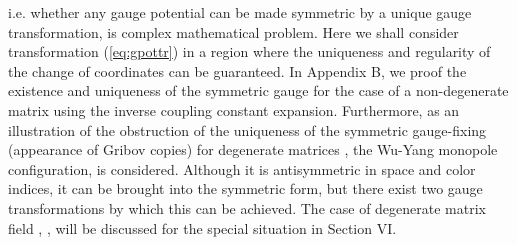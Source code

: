 \documentclass[a4paper,12pt]{article}
\begin{document}
i.e. whether any gauge potential \coordHE{} can be made symmetric by a
unique gauge transformation, is complex mathematical problem.
Here we shall consider transformation (\ref{eq:gpottr}) in a region where
the uniqueness and regularity of the change of coordinates
can be guaranteed.
In Appendix B, we proof the existence and uniqueness of the symmetric
gauge for the case of a non-degenerate matrix \coordHE{}
using the inverse coupling constant expansion.
Furthermore, as an illustration of the obstruction of the uniqueness of
the symmetric gauge-fixing (appearance of Gribov copies) for degenerate
matrices \coordHE{}, the Wu-Yang monopole configuration, is considered.
Although it is antisymmetric in space and color indices,
it can be brought into the symmetric form, but there exist two
gauge transformations by which this can be achieved.
The case of degenerate matrix field \coordHE{}, \coordHE{}, will be discussed
for the special situation \coordHE{} in Section VI.
\end{document}
